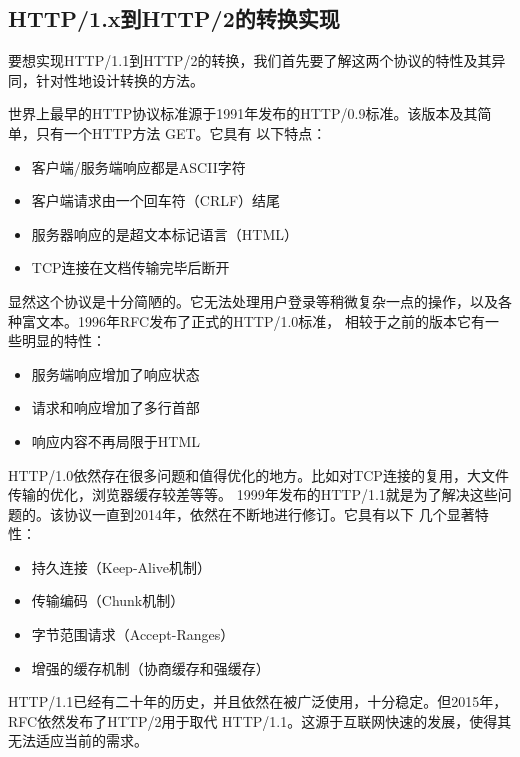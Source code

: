 \documentclass[twoside]{CUGThesis}
\begin{document}
	\begin{spacing}{2}
		\section{HTTP/1.x到HTTP/2的转换实现}
	\end{spacing}
	要想实现HTTP/1.1到HTTP/2的转换，我们首先要了解这两个协议的特性及其异同，针对性地设计转换的方法。\par
	世界上最早的HTTP协议标准源于1991年发布的HTTP/0.9标准。该版本及其简单，只有一个HTTP方法 GET。它具有
	以下特点：
	\begin{itemize}
		\item 客户端/服务端响应都是ASCII字符
		\item 客户端请求由一个回车符（CRLF）结尾
		\item 服务器响应的是超文本标记语言（HTML）
		\item TCP连接在文档传输完毕后断开
	\end{itemize}
	\par
	显然这个协议是十分简陋的。它无法处理用户登录等稍微复杂一点的操作，以及各种富文本。1996年RFC发布了正式的HTTP/1.0标准，
	相较于之前的版本它有一些明显的特性：
	\begin{itemize}
		\item 服务端响应增加了响应状态
		\item 请求和响应增加了多行首部
		\item 响应内容不再局限于HTML
	\end{itemize}
	\par
	HTTP/1.0依然存在很多问题和值得优化的地方。比如对TCP连接的复用，大文件传输的优化，浏览器缓存较差等等。
	1999年发布的HTTP/1.1就是为了解决这些问题的。该协议一直到2014年，依然在不断地进行修订。它具有以下
	几个显著特性：
	\begin{itemize}
		\item 持久连接（Keep-Alive机制）
		\item 传输编码（Chunk机制）
		\item 字节范围请求（Accept-Ranges）
		\item 增强的缓存机制（协商缓存和强缓存）
	\end{itemize}
	\par
	HTTP/1.1已经有二十年的历史，并且依然在被广泛使用，十分稳定。但2015年，RFC依然发布了HTTP/2用于取代
	HTTP/1.1。这源于互联网快速的发展，使得其无法适应当前的需求。\par 
\end{document}
